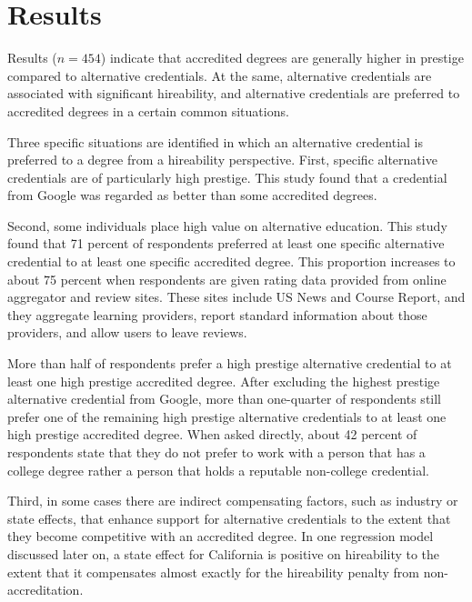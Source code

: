 \documentclass[review]{elsarticle}
\begin{document}
\section{Results}


Results ($n = 454$) indicate that accredited degrees are generally higher in prestige compared to alternative credentials.
At the same, alternative credentials are associated with significant hireability,
and alternative credentials are preferred to accredited degrees in a certain common situations.

Three specific situations are identified in which an alternative credential is preferred to a degree from a hireability perspective.
First, specific alternative credentials are of particularly high prestige.
This study found that a credential from Google was regarded as better than some accredited degrees.

Second, some individuals place high value on alternative education.
This study found that 71 percent of respondents preferred at least one specific alternative credential to at least one specific accredited degree.
This proportion increases to about 75 percent when respondents are given rating data provided from online aggregator and review sites.
These sites include US News and Course Report, and they aggregate learning providers, report standard information about those providers, and allow users to leave reviews.

More than half of respondents prefer a high prestige alternative credential to at least one high prestige accredited degree.
After excluding the highest prestige alternative credential from Google,
more than one-quarter of respondents still prefer one of the remaining high prestige alternative credentials to at least one high prestige accredited degree.
When asked directly, about 42 percent of respondents state that they do not prefer
to work with a person that has a college degree rather a person that holds a reputable non-college credential.

Third, in some cases there are indirect compensating factors, such as industry or state effects,
that enhance support for alternative credentials to the extent that they become competitive with an accredited degree.
In one regression model discussed later on, a state effect for California is positive on hireability
to the extent that it compensates almost exactly for the hireability penalty from non-accreditation.
\end{document}
